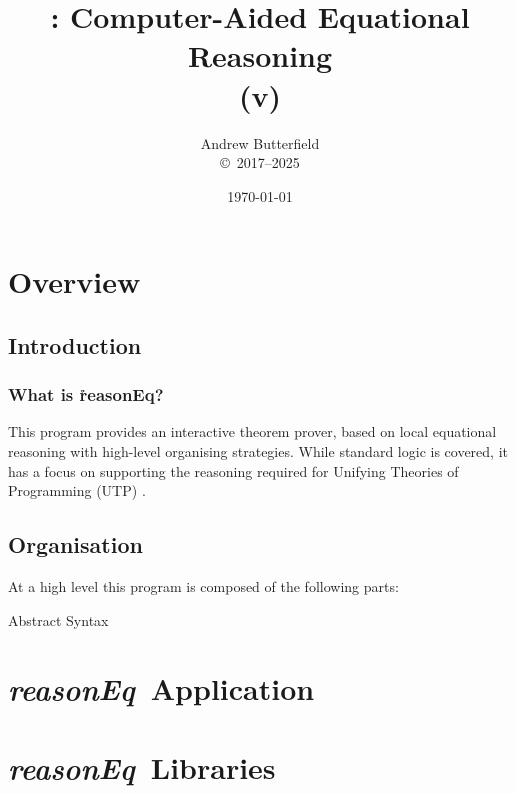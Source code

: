 \documentclass[fleqn,10pt]{report}
\author{
Andrew Butterfield
\\
{\small \copyright\ 2017--2025}
}
\title{
  \reasonEq: Computer-Aided Equational Reasoning
  \\(v\reqVersion)
}
\date{
\today
}
\def\reasonEq{\textit{\textsf{reasonEq}}}
\begin{document}
\maketitle
\setcounter{tocdepth}{1}
\tableofcontents

\part{Overview}

\chapter{Introduction}

\section{What is \h{reasonEq}?}

This program provides an interactive theorem prover,
based on local equational reasoning with high-level organising strategies.
While standard logic is covered, 
it has a focus on supporting the reasoning required for
Unifying Theories of Programming (UTP) \cite{UTP-book}.

\chapter{Organisation}

At a high level this program is composed of the following parts:
\begin{description}
  \item[Abstract Syntax] 
\end{description}

\part{\reasonEq\ Application}
% 

% 

\part{\reasonEq\ Libraries}


\end{document}
